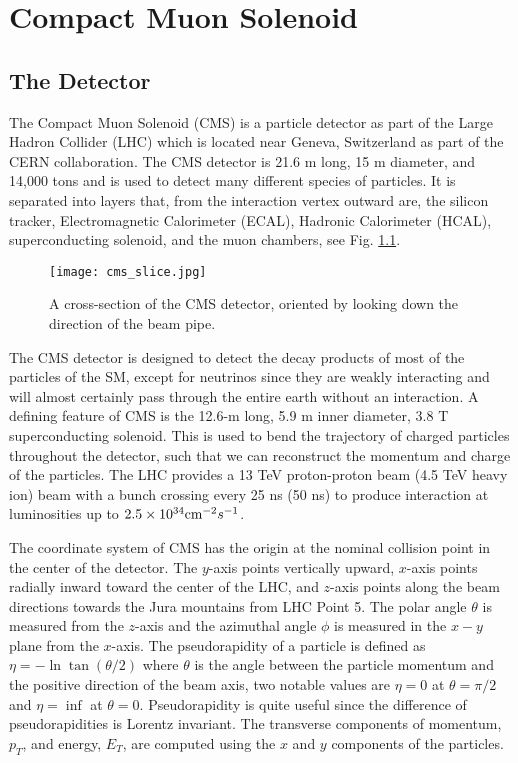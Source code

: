 



\chapter{Compact Muon Solenoid}
\label{ch:CMS}

\section{The Detector}
\label{sec:cmsIntro}

The Compact Muon Solenoid (CMS) is a particle detector as part of the Large Hadron Collider (LHC) which is located near Geneva, Switzerland as part of the CERN collaboration. The CMS detector is 21.6 m long, 15 m diameter, and 14,000 tons and is used to detect many different species of particles. It is separated into layers that, from the interaction vertex outward are, the silicon tracker, Electromagnetic Calorimeter (ECAL), Hadronic Calorimeter (HCAL), superconducting solenoid, and the muon chambers, see Fig. \ref{CMSSlice}. 

\begin{figure}
 	\centering
	\texttt{[image: cms\_slice.jpg]}
 	\caption[CMS Cross Section]{A cross-section of the CMS detector, oriented by looking down the direction of the beam pipe. }
 	\label{CMSSlice} 
\end{figure}

The CMS detector is designed to detect the decay products of most of the particles of the SM, except for neutrinos since they are weakly interacting and will almost certainly pass through the entire earth without an interaction. A defining feature of CMS is the 12.6-m long, 5.9 m inner diameter, 3.8 T superconducting solenoid. This is used to bend the trajectory of charged particles throughout the detector, such that we can reconstruct the momentum and charge of the particles. The LHC provides a 13 TeV proton-proton beam (4.5 TeV heavy ion) beam with a bunch crossing every 25 ns (50 ns) to produce interaction at luminosities up to $2.5\times10^{34} \text{cm}^{-2}s^{-1}$. 

The coordinate system of CMS has the origin at the nominal collision point in the center of the detector. The $y$-axis points vertically upward, $x$-axis points radially inward toward the center of the LHC, and $z$-axis points along the beam directions towards the Jura mountains from LHC Point 5. The polar angle $\theta$ is measured from the $z$-axis and the azimuthal angle $\phi$ is measured in the $x-y$ plane from the $x$-axis. The pseudorapidity of a particle is defined as $\eta=-\ln\tan(\theta/2)$ where $\theta$ is the angle between the particle momentum and the positive direction of the beam axis, two notable values are $\eta=0$ at $\theta=\pi/2$ and $\eta=\inf$ at $\theta=0$. Pseudorapidity is quite useful since the difference of pseudorapidities is Lorentz invariant. The transverse components of momentum, $p_T$, and energy, $E_T$, are computed using the $x$ and $y$ components of the particles. 

